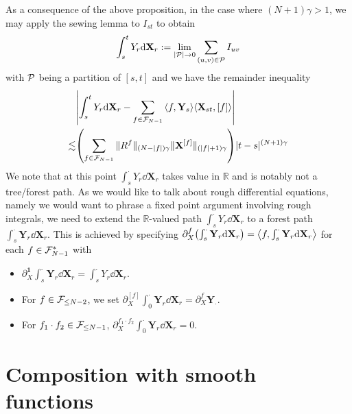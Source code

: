 \documentclass[a4paper, 10pt]{style/preprint}
\begin{document}
As a consequence of the above proposition, in the case where \((N + 1) \gamma > 1\), we may apply the sewing 
lemma to \(I_{st}\) to obtain 
\[\int_s^t Y_r \dd \mathbf{X}_r := \lim_{|{\mathcal P}| \to 0} \sum_{(u, v) \in {\mathcal P}} I_{uv}\]
with \({\mathcal P}\) being a partition of \([s, t]\) and we have the remainder inequality 
\begin{align*}
  & \left|\int_s^t Y_r \dd \mathbf{X}_r - \sum_{f \in \CF_{N - 1}} \< f, \mathbf{Y}_s\> \< \mathbf{X}_{st}, [f]\>\right|\\
  \lesssim & \left(\sum_{f \in \CF_{N - 1}} \|R^f\|_{(N - |f|)\gamma} \|\mathbf{X}^{[f]}\|_{(|f| + 1)\gamma}\right)|t - s|^{(N + 1)\gamma}
\end{align*}
We note that at this point \(\int_s^{\cdot} Y_r \dd \mathbf{X}_r\) takes value in \(\mathbb{R}\) and is notably not a tree/forest 
path. As we would like to talk about rough differential equations, namely we would want to phrase a fixed point 
argument involving rough integrals, we need to extend the \(\mathbb{R}\)-valued path \(\int_s^{\cdot} Y_r \dd \mathbf{X}_r\) 
to a forest path \(\int_s^{\cdot} \mathbf{Y}_r \dd \mathbf{X}_r\). This is achieved by specifying 
\(\partial^f_X \left(\int_s^{\cdot} \mathbf{Y}_r \dd \mathbf{X}_r\right) = \< f, \int_s^{\cdot} \mathbf{Y}_r \dd \mathbf{X}_r \>\) 
for each \(f \in {\mathcal F}_{N - 1}^*\) with 
\begin{itemize}
  \item \(\partial^{\mathbf{1}}_X \int_s^{\cdot} \mathbf{Y}_r \dd \mathbf{X}_r = \int_s^{\cdot} Y_r \dd \mathbf{X}_r\).
  \item For \(f \in {\mathcal F}_{\le N - 2}\), we set \(\partial^{[f]}_X \int_0^{\cdot} \mathbf{Y}_r \dd \mathbf{X}_r 
    = \partial^f_X \mathbf{Y}_{\cdot}\).
    \item For \(f_1 \cdot f_2 \in {\mathcal F}_{\le N - 1}\), \(\partial^{f_1 \cdot f_2}_X \int_0^{\cdot} \mathbf{Y}_r \dd \mathbf{X}_r = 0\).
\end{itemize}

\section{Composition with smooth functions}
\end{document}
